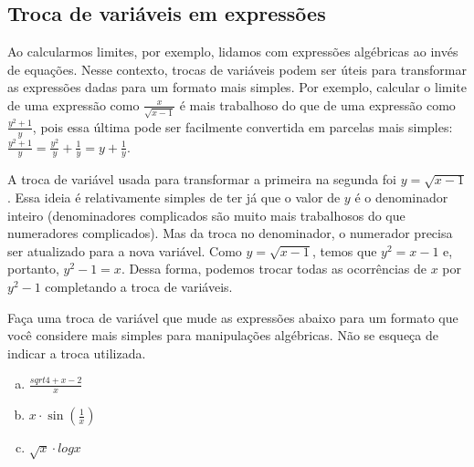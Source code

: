 \documentclass[main.tex]{subfiles}
\begin{document}
\subsection*{Troca de variáveis em expressões}

Ao calcularmos limites, por exemplo, lidamos com expressões algébricas ao invés de equações. Nesse contexto, trocas de variáveis podem ser úteis para transformar as expressões dadas para um formato mais simples. Por exemplo, calcular o limite de uma expressão como $\frac{x}{\sqrt{x-1}}$ é mais trabalhoso do que de uma expressão como $\frac{y^2+1}{y}$, pois essa última pode ser facilmente convertida em parcelas mais simples: $\frac{y^2+1}{y}=\frac{y^2}{y}+\frac{1}{y}=y+\frac{1}{y}$.

A troca de variável usada para transformar a primeira na segunda foi $y=\sqrt{x-1}$. Essa ideia é relativamente simples de ter já que o valor de $y$ é o denominador inteiro (denominadores complicados são muito mais trabalhosos do que numeradores complicados). Mas da troca no denominador, o numerador precisa ser atualizado para a nova variável. Como $y=\sqrt{x-1}$, temos que $y^2=x-1$ e, portanto, $y^2-1=x$. Dessa forma, podemos trocar todas as ocorrências de $x$ por $y^2-1$ completando a troca de variáveis.


\begin{questao}
Faça uma troca de variável que mude as expressões abaixo para um formato que você considere mais simples para manipulações algébricas. Não se esqueça de indicar a troca utilizada.
\begin{enumerate}[a)]
\item $\frac{sqrt{4+x}-2}{x}$
\item $x \cdot \sin(\frac{1}{x})$
\item $\sqrt{x} \cdot log x$
\end{enumerate}
\end{questao}
\end{document}
